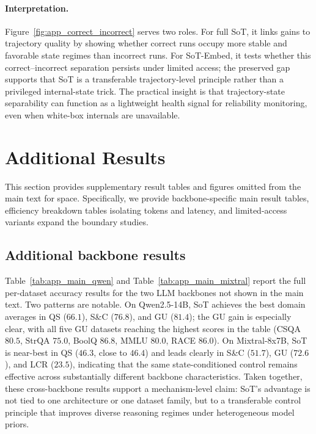 \paragraph{Interpretation.}
Figure~\ref{fig:app_correct_incorrect} serves two roles.
For full SoT, it links gains to trajectory quality by showing whether correct runs occupy more stable and favorable state regimes than incorrect runs.
For SoT-Embed, it tests whether this correct--incorrect separation persists under limited access; the preserved gap supports that SoT is a transferable trajectory-level principle rather than a privileged internal-state trick.
The practical insight is that trajectory-state separability can function as a lightweight health signal for reliability monitoring, even when white-box internals are unavailable.

\section{Additional Results}
\label{app:additional_results}

This section provides supplementary result tables and figures omitted from the main text for space.
Specifically, we provide backbone-specific main result tables, efficiency breakdown tables isolating tokens and latency, and limited-access variants expand the boundary studies.

\subsection{Additional backbone results}

Table~\ref{tab:app_main_qwen} and Table~\ref{tab:app_main_mixtral} report the full per-dataset accuracy results for the two LLM backbones not shown in the main text.
Two patterns are notable.
On Qwen2.5-14B, SoT achieves the best domain averages in QS (\(66.1\)), S\&C (\(76.8\)), and GU (\(81.4\)); the GU gain is especially clear, with all five GU datasets reaching the highest scores in the table (CSQA \(80.5\), StrQA \(75.0\), BoolQ \(86.8\), MMLU \(80.0\), RACE \(86.0\)).
On Mixtral-8x7B, SoT is near-best in QS (\(46.3\), close to \(46.4\)) and leads clearly in S\&C (\(51.7\)), GU (\(72.6\)), and LCR (\(23.5\)), indicating that the same state-conditioned control remains effective across substantially different backbone characteristics.
Taken together, these cross-backbone results support a mechanism-level claim: SoT's advantage is not tied to one architecture or one dataset family, but to a transferable control principle that improves diverse reasoning regimes under heterogeneous model priors.

